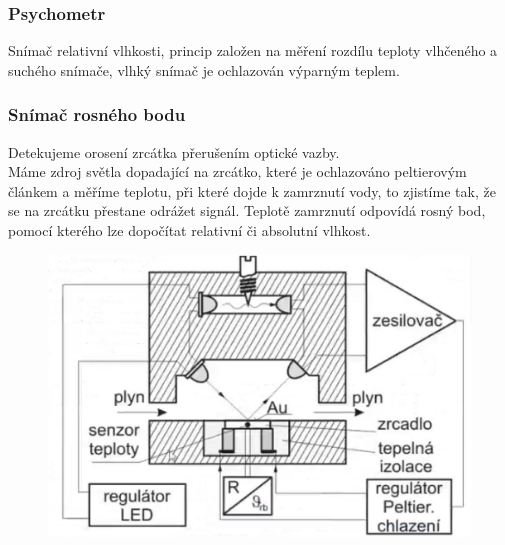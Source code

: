 \subsubsection{Psychometr}
Snímač relativní vlhkosti, princip založen na měření rozdílu teploty vlhčeného a suchého snímače, vlhký snímač je ochlazován výparným teplem.

\subsubsection{Snímač rosného bodu}
Detekujeme orosení zrcátka přerušením optické vazby.\\
Máme zdroj světla dopadající na zrcátko, které je ochlazováno peltierovým článkem a měříme teplotu, při které dojde k zamrznutí vody, to zjistíme tak, že se na zrcátku přestane odrážet signál. Teplotě zamrznutí odpovídá rosný bod, pomocí kterého lze dopočítat relativní či absolutní vlhkost.\\
\begin{figure}[h!]
    \centering
    \includegraphics[scale = 0.1]{img/RosBod.png}
\end{figure}